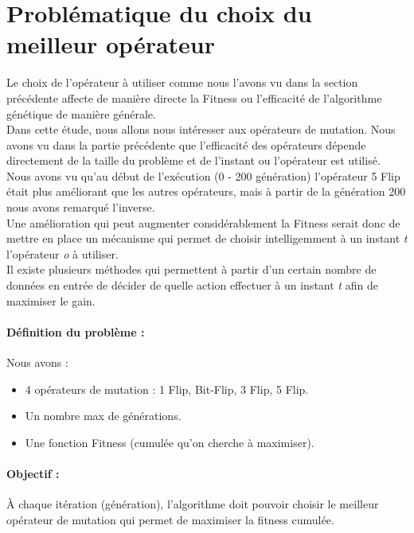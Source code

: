 \documentclass[12pt]{article}
\begin{document}

\section{Problématique du choix du meilleur opérateur}
Le choix de l'opérateur à utiliser comme nous l'avons vu dans la section précédente affecte de manière directe la Fitness ou l'efficacité de l'algorithme génétique de manière générale.\\

Dans cette étude, nous allons nous intéresser aux opérateurs de mutation. Nous avons vu dans la partie précédente que l'efficacité des opérateurs dépende directement de la taille du problème et de l'instant ou l'opérateur est utilisé. Nous avons vu qu'au début de l'exécution (0 - 200 génération) l'opérateur 5 Flip était plus améliorant que les autres opérateurs, mais à partir de la génération 200 nous avons remarqué l'inverse.\\

Une amélioration qui peut augmenter considérablement la Fitness serait donc de mettre en place un mécanisme qui permet de choisir intelligemment à un instant \textit{t} l'opérateur \textit{o} à utiliser.\\

Il existe plusieurs méthodes qui permettent à partir d'un certain nombre de données en entrée de décider de quelle action effectuer à un instant \textit{t} afin de maximiser le gain.

\paragraph{Définition du problème :} Nous avons :
\begin{itemize}[label=-]
\item 4 opérateurs de mutation : 1 Flip, Bit-Flip, 3 Flip, 5 Flip. 
\item Un nombre max de générations.
\item Une fonction Fitness (cumulée qu'on cherche à maximiser).
\end{itemize}
\paragraph{Objectif : } À chaque itération (génération), l'algorithme doit pouvoir choisir le meilleur opérateur de mutation qui permet de maximiser la fitness cumulée. 
\end{document}
